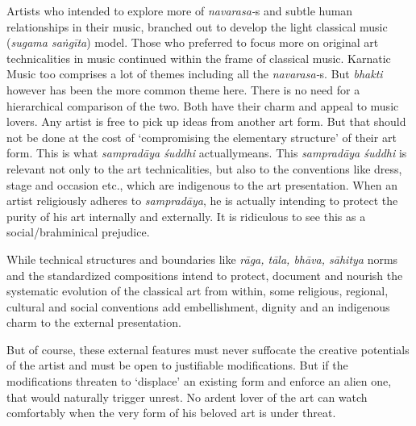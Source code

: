 Artists who intended to explore more of \textit{navarasa-}s and subtle human relationships in their music, branched out to develop the light classical music (\textit{sugama saṅgīta}) model. Those who preferred to focus more on original art technicalities in music continued within the frame of classical music. Karnatic Music too comprises a lot of themes including all the \textit{navarasa-}s. But \textit{bhakti} however has been the more common theme here. There is no need for a hierarchical comparison of the two. Both have their charm and appeal to music lovers. Any artist is free to pick up ideas from another art form. But that should not be done at the cost of ‘compromising the elementary structure’ of their art form. This is what \textit{sampradāya śuddhi} actuallymeans. This \textit{sampradāya śuddhi} is relevant not only to the art technicalities, but also to the conventions like dress, stage and occasion etc., which are indigenous to the art presentation. When an artist religiously adheres to \textit{sampradāya}, he is actually intending to protect the purity of his art internally and externally. It is ridiculous to see this as a social/brahminical prejudice.

While technical structures and boundaries like \textit{rāga, tāla, bhāva, sāhitya} norms and the standardized compositions intend to protect, document and nourish the systematic evolution of the classical art from within, some religious, regional, cultural and social conventions add embellishment, dignity and an indigenous charm to the external presentation.

But of course, these external features must never suffocate the creative potentials of the artist and must be open to justifiable modifications. But if the modifications threaten to ‘displace’ an existing form and enforce an alien one, that would naturally trigger unrest. No ardent lover of the art can watch comfortably when the very form of his beloved art is under threat.

